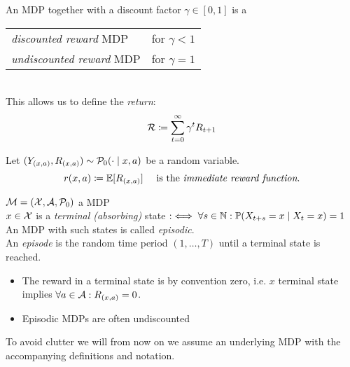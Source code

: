 \begin{definition}
An MDP together with a discount factor \(\gamma\in[0,1]\) is a
\par\begin{tabular}{l l}
	\emph{discounted reward} MDP & for \(\gamma <1 \)\\
	\emph{undiscounted reward} MDP & for \(\gamma=1 \)
\end{tabular}\\
This allows us to define the \emph{return}:
\[\mathcal{R}\coloneqq\sum_{t=0}^{\infty}\gamma^t R_{t+1}\]
\end{definition}

\begin{definition}
Let \((Y_{(x,a)}, R_{(x,a)})\sim \mathcal{P}_0(\cdot\mid x,a) \) be a random variable.
\[r(x,a)\coloneqq \mathbb{E}[R_{(x,a)}] \quad\text{ is the \emph{immediate reward function}.}\]
\end{definition}

\begin{definition}\(\mathcal{M}=(\mathcal{X},\mathcal{A},\mathcal{P}_0)\) a MDP\\
	\(x\in\mathcal{X}\) is a \emph{terminal (absorbing)} state \(:\iff \forall s\in\mathbb{N}: \mathbb{P}(X_{t+s}=x\mid X_t=x)=1\)\\
	An MDP with such states is called \emph{episodic}.\\
	An \emph{episode} is the random time period \((1,\dots,T)\) until a terminal state is reached.
\end{definition}
\begin{remark}\leavevmode
	\begin{itemize}
		\item The reward in a terminal state is by convention zero, i.e. \(x\) terminal state implies \(\forall a\in\mathcal{A}: R_{(x,a)}=0\).
		\item Episodic MDPs are often undiscounted
	\end{itemize}	
\end{remark}


To avoid clutter we will from now on we assume an underlying MDP with the accompanying definitions and notation.

